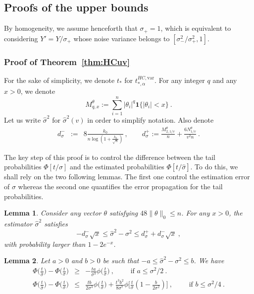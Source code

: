 \documentclass[twoside,11pt]{article}
\newtheorem{lem}{Lemma}
\def\beq{\begin{equation}}
\def\eeq{\end{equation}}
\newcommand{\<}{\langle}
\renewcommand{\>}{\rangle}
\begin{document}
\subsection{Proofs of the upper bounds}

By homogeneity, we assume henceforth that $\sigma_+=1$, which is equivalent to considering $Y'=Y/\sigma_+$ whose noise variance belongs to $[\sigma^2_-/\sigma^2_+,1]$.

\subsubsection{Proof of Theorem~\ref{thm:HCuv}}

For the sake of simplicity, we denote $t_{*}$ for $t_{*,\alpha}^{HC,\mathrm{var}}$. For any integer $q$ and any $x>0$, we denote
\beq\label{eq:definition_M}
M_{q,x}^{\theta}:= \sum_{i=1}^n |\theta_i|^q \mathbf{1}\{|\theta_i|<x\}\ .
\eeq
Let us write $\widehat{\sigma}^2$ for $\widehat{\sigma}^2(v)$ in order to simplify notation. Also denote
 \begin{eqnarray} \label{eq:upper_loss_sigma_def}
  d_{\sigma}^{-}&:=& 8\frac{k_0}{n\log(1+\frac{k_0}{\sqrt{n}})}\ , \quad \quad   d_{\sigma}^{+}:= \frac{M_{2,1/v}^{\theta}}{n}   + \frac{6N_{1/v}^{\theta}}{v^2 n}\ .
 \end{eqnarray}

The key step of this proof is to control the difference between the tail probabilities $\Phi[t/\sigma]$ and the estimated probabilities $\Phi[t/\widehat{\sigma}]$. To do this, we shall rely on the two following lemmas. The first one control the estimation error of $\sigma$ whereas the second one quantifies the error propagation for the tail probabilities. 
 
\begin{lem}\label{lem:sig}
Consider any vector $\theta$ satisfying $48 \|\theta\|_0\leq n$. For any $x>0$, the estimator $\widehat{\sigma}^2$ satisfies
\beq \label{eq:upper_loss_sigma}
 - d_\sigma^{-}\sqrt{x}\leq \widehat{\sigma}^2- \sigma^2 \leq d_\sigma^+ +d_\sigma^{-}\sqrt{x}\ ,
 \eeq
with probability larger than $1-2e^{-x}$. 
\end{lem}




\begin{lem}\label{lem:diff_phi}
Let $a>0$ and $b>0$ be such that  $-a \leq \widehat{\sigma}^2-\sigma^2\leq b$. We have
\begin{eqnarray}
\label{eq:lower_diff_Phi} 
\Phi\big(\frac{t}{\widehat{\sigma}}\big) -\Phi\big(\frac{t}{\sigma}\big)&\geq&  -\frac{ta}{\sigma^3} \phi\big(\frac{t}{\sigma}\big)\ ,\quad \quad   \text{ if }a\leq \sigma^2/2\ .\\
\label{eq:upper_diff_Phi}
\Phi\big(\frac{t}{\widehat{\sigma}}\big) -\Phi\big(\frac{t}{\sigma}\big) &\leq & \frac{tb }{2\sigma^3} \phi\big(\frac{t}{\sigma}\big) + \frac{t^3 b^2}{8\sigma^7} \phi\big[\frac{t}{\sigma}(1- \frac{b}{2\sigma^2})\big]\ ,\quad \quad  \text{ if }b\leq \sigma^2/4\ .  
\end{eqnarray}


\end{lem}
\end{document}
